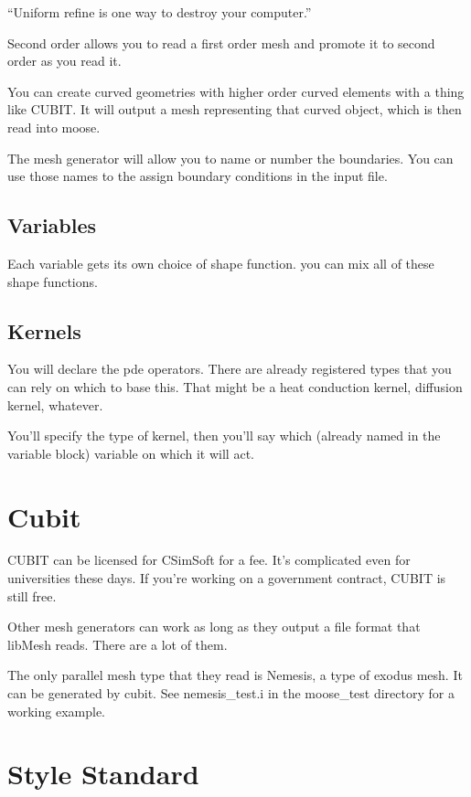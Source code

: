 ``Uniform refine is one way to destroy your computer.'' 

Second order allows you to read a first order mesh and promote it to second 
order as you read it. 

You can create curved geometries with higher order curved elements with a thing 
like CUBIT. It will output a mesh representing that curved object, which is then 
read into moose.

The mesh generator will allow you to name or number the boundaries. You can use 
those names to the assign boundary conditions in the input file.

\subsection{Variables}

Each variable gets its own choice of shape function. you can mix all of these 
shape functions. 


\subsection{Kernels}

You will declare the pde operators. There are already registered types that you 
can rely on which to base this. That might be a heat conduction kernel, 
diffusion kernel, whatever.

You'll specify the type of kernel, then you'll say which (already named in the 
variable block) variable on which it will act. 



\section{Cubit}

CUBIT can be licensed for CSimSoft for a fee. It's complicated even for 
universities these days. If you're working on a government contract, CUBIT is 
still free. 

Other mesh generators can work as long as they output a file format that libMesh 
reads. There are a lot of them. 

The only parallel mesh type that they read is Nemesis, a type of exodus mesh. It 
can be generated by cubit. See nemesis\_test.i in the moose\_test directory for a 
working example.


\section{Style Standard}

